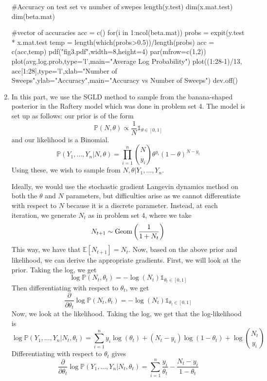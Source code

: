 \documentclass[letterpaper,12pt]{amsart}
\newcommand{\sumin}{\sum_{i=1}^n}
\newcommand{\prodin}{\prod_{i=1}^n}
\newcommand{\E}[1]{\mathbb{E}\!\left[#1\right]}
\newcommand{\p}[1]{\mathbb{P}\!\left(#1\right)}
\newcommand{\Geom}{\textnormal{Geom}}
\newenvironment{verbatimcode}{\bigskip \scriptsize \verbatim}{\endverbatim \normalsize \bigskip}
\begin{document}
\begin{enumerate}[1.]
\begin{verbatimcode}
#Accuracy on test set vs number of swepes
length(y.test)
dim(x.mat.test)
dim(beta.mat)

#vector of accuracies
acc = c()
for(i in 1:ncol(beta.mat))
{
  probs = expit(y.test * x.mat.test %
  temp = length(which(probs>0.5))/length(probs)
  acc = c(acc,temp)
}
pdf("fig3.pdf",width=8,height=4)
par(mfrow=c(1,2))
plot(avg.log.prob,type='l',main="Average Log Probability")
plot((1:28-1)/13, acc[1:28],type='l',xlab="Number of Sweeps",ylab="Accuracy",main="Accuracy vs Number of Sweeps")
dev.off()
\end{verbatimcode}



\item 
In this part, we use the SGLD method to sample from the banana-shaped posterior in the Raftery model which was done in problem set 4. The model is set up as follows: our prior is of the form
\[\p{N, \theta} \propto \frac{1}{N} \mathds{1}_{\theta \in [0,1]}\]
and our likelihood is a Binomial.
\[\p{Y_1,\ldots,Y_n | N, \theta} = \prodin \binom{N}{y_i} \theta^{y_i} (1-\theta)^{N-y_i} \]
Using these, we wish to sample from $N,\theta | Y_1,\ldots,Y_n$.

Ideally, we would use the stochastic gradient Langevin dynamics method on both the $\theta$ and $N$ parameters, but difficulties arise as we cannot differentiate with respect to $N$ because it is a discrete parameter. Instead, at each iteration, we generate $N_t$ as in problem set 4, where we take 
\[N_{t+1} \sim \Geom\left(\frac{1}{1 + N_t}\right)\]
This way, we have that $\E{N_{t+1}} = N_t$. Now, based on the above prior and likelihood, we can derive the appropriate gradients. First, we will look at the prior. Taking the log, we get
\[\log \p{N_t, \theta_t} = - \log(N_t) \mathds{1}_{\theta_t \in [0,1]} \]
Then differentiating with respect to $\theta_t$, we get
\begin{equation}\label{priorderiv}
\frac{\partial}{\partial \theta_t} \log \p{N_t, \theta_t} = - \log (N_t)\mathds{1}_{\theta_t \in [0,1]}
\end{equation}
Now, we look at the likelihood. Taking the log, we get that the log-likelihood is 
\[\log \p{Y_1,\ldots,Y_n | N_t, \theta_t} = \sumin y_i \log (\theta_t) + (N_t - y_i) \log(1-\theta_t) + \log \binom{N_t}{y_i}\]
Differentiating with respect to $\theta_t$ gives
\begin{equation}
\frac{\partial}{\partial \theta_t} \log \p{Y_1,\ldots,Y_n | N_t, \theta_t} = \sumin \frac{y_i}{\theta_t} - \frac{N_t - y_i}{1-\theta_t}
\end{equation}\label{likelihoodderiv}


\end{enumerate}
\end{document}
